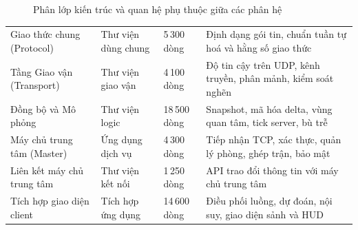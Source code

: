 \begin{figure}[H]
\caption{Phân lớp kiến trúc và quan hệ phụ thuộc giữa các phân hệ}
\label{fig:n-phanlop}
\end{figure}

\begin{center}\small
\begin{tabularx}{\linewidth}{|L{4.6cm}|L{2.4cm}|L{1.5cm}|Y|}
\hline
{} &  &  &  \\ \hline
Giao thức chung (Protocol) & Thư viện dùng chung & 5\,300 dòng & Định dạng gói tin, chuẩn tuần tự hoá và hằng số giao thức \\ \hline
Tầng Giao vận (Transport) & Thư viện giao vận & 4\,100 dòng & Độ tin cậy trên UDP, kênh truyền, phân mảnh, kiểm soát nghẽn \\ \hline
Đồng bộ và Mô phỏng & Thư viện logic & 18\,500 dòng & Snapshot, mã hóa delta, vùng quan tâm, tick server, bù trễ \\ \hline
Máy chủ trung tâm (Master) & Ứng dụng dịch vụ & 4\,300 dòng & Tiếp nhận TCP, xác thực, quản lý phòng, ghép trận, bảo mật \\ \hline
Liên kết máy chủ trung tâm & Thư viện kết nối & 1\,250 dòng & API trao đổi thông tin với máy chủ trung tâm \\ \hline
Tích hợp giao diện client & Tích hợp ứng dụng & 14\,600 dòng & Điều phối luồng, dự đoán, nội suy, giao diện sảnh và HUD \\ \hline
\end{tabularx}
\end{center}

